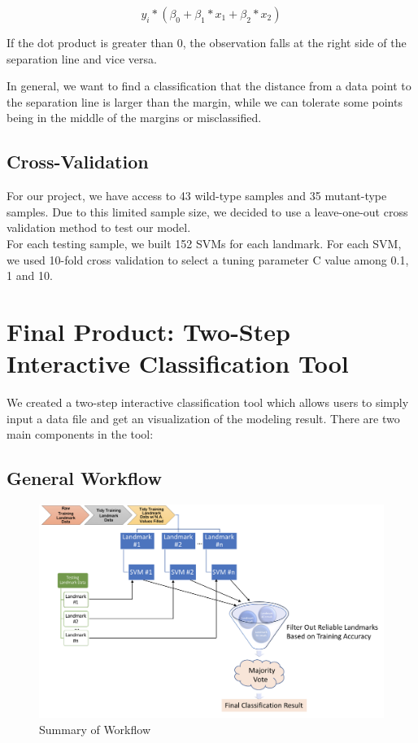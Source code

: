 \documentclass[10pt,letterpaper]{article}
\begin{document}
\[y_i * ( \beta_0 + \beta_1 * x_1 + \beta_2 * x_2 )\]

If the dot product is greater than 0, the observation falls at the right
side of the separation line and vice versa.

In general, we want to find a classification that the distance from a
data point to the separation line is larger than the margin, while we
can tolerate some points being in the middle of the margins or
misclassified.

\subsection{Cross-Validation}\label{cross-validation}

For our project, we have access to 43 wild-type samples and 35
mutant-type samples. Due to this limited sample size, we decided to use
a leave-one-out cross validation method to test our model.\\
For each testing sample, we built 152 SVMs for each landmark. For each
SVM, we used 10-fold cross validation to select a tuning parameter C
value among 0.1, 1 and 10.

\section{Final Product: Two-Step Interactive Classification
Tool}\label{final-product-two-step-interactive-classification-tool}

We created a two-step interactive classification tool which allows users
to simply input a data file and get an visualization of the modeling
result. There are two main components in the tool:

\subsection{General Workflow}\label{general-workflow}

\begin{figure}[h]

{\centering \includegraphics{figures/Figure1} 

}

\caption{Summary of Workflow}\label{fig:workflow}
\end{figure}
\end{document}
